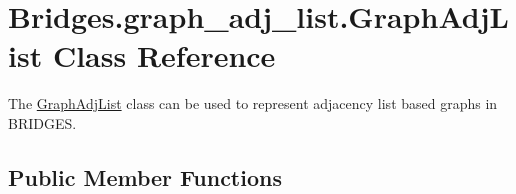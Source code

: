 \hypertarget{class_bridges_1_1graph__adj__list_1_1_graph_adj_list}{}\section{Bridges.\+graph\+\_\+adj\+\_\+list.\+Graph\+Adj\+List Class Reference}
\label{class_bridges_1_1graph__adj__list_1_1_graph_adj_list}


The \mbox{\hyperlink{class_bridges_1_1graph__adj__list_1_1_graph_adj_list}{Graph\+Adj\+List}} class can be used to represent adjacency list based graphs in B\+R\+I\+D\+G\+ES.  


\subsection*{Public Member Functions}
